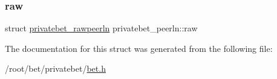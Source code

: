 \subsubsection{\texorpdfstring{raw}{raw}}
{\footnotesize\ttfamily struct \hyperlink{structprivatebet__rawpeerln}{privatebet\+\_\+rawpeerln} privatebet\+\_\+peerln\+::raw}



The documentation for this struct was generated from the following file\+:\begin{DoxyCompactItemize}
\item 
/root/bet/privatebet/\hyperlink{bet_8h}{bet.\+h}\end{DoxyCompactItemize}
